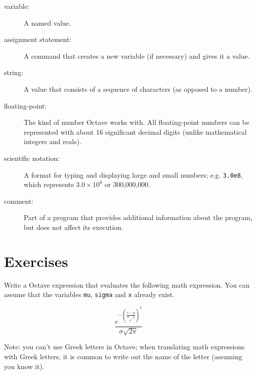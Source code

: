 \begin{description}
\item[variable:] A named value.  

\item[assignment statement:] A command that creates a new variable
(if necessary) and gives it a value.

\item[string:] A value that consists of a sequence of characters (as
opposed to a number). 

\item[floating-point:] The kind of number Octave works with. All
floating-point numbers can be represented with about 16 significant
decimal digits (unlike mathematical integers and reals).

\item[scientific notation:] A format for typing and displaying large
and small numbers; e.g. {\tt 3.0e8}, which represents $3.0 \times 10^8$
or 300,000,000. 

\item[comment:] Part of a program that provides additional information
about the program, but does not affect its execution. 

\end{description}


\section{Exercises}

\begin{ex}
Write a Octave expression that evaluates the
following math expression. You can assume that the variables
{\tt mu}, {\tt sigma} and {\tt x} already exist.

\begin{equation}
\frac{e^{- \left( \frac{x-\mu}{\sigma \sqrt{}2} \right) ^2}}
{\sigma \sqrt{2 \pi}}
\end{equation}

Note: you can't use Greek letters in Octave; when translating
math expressions with Greek letters, it is common to write out
the name of the letter (assuming you know it).
\end{ex}

